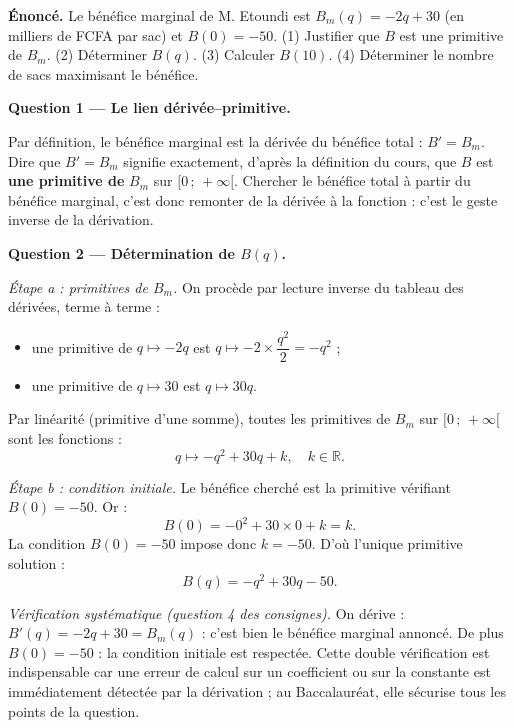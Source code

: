 \documentclass[11pt]{article}
\begin{document}
\begin{exoresolu}
\textbf{Énoncé.} Le bénéfice marginal de M. Etoundi est $B_m(q) = -2q + 30$ (en milliers de FCFA par sac) et $B(0) = -50$. (1) Justifier que $B$ est une primitive de $B_m$. (2) Déterminer $B(q)$. (3) Calculer $B(10)$. (4) Déterminer le nombre de sacs maximisant le bénéfice.

\tcblower

\textbf{Question 1 — Le lien dérivée--primitive.}

Par définition, le bénéfice marginal est la dérivée du bénéfice total : $B' = B_m$. Dire que $B' = B_m$ signifie exactement, d'après la définition du cours, que $B$ est \textbf{une primitive de} $B_m$ sur $[0\,;\,+\infty[$. Chercher le bénéfice total à partir du bénéfice marginal, c'est donc \og remonter \fg{} de la dérivée à la fonction : c'est le geste inverse de la dérivation.

\medskip

\textbf{Question 2 — Détermination de $B(q)$.}

\emph{Étape a : primitives de $B_m$.} On procède par lecture inverse du tableau des dérivées, terme à terme :
\begin{itemize}
\item une primitive de $q \longmapsto -2q$ est $q \longmapsto -2 \times \dfrac{q^2}{2} = -q^2$ ;
\item une primitive de $q \longmapsto 30$ est $q \longmapsto 30q$.
\end{itemize}
Par linéarité (primitive d'une somme), toutes les primitives de $B_m$ sur $[0\,;\,+\infty[$ sont les fonctions :
\[ q \longmapsto -q^2 + 30q + k, \quad k \in \mathbb{R}. \]

\emph{Étape b : condition initiale.} Le bénéfice cherché est la primitive vérifiant $B(0) = -50$. Or :
\[ B(0) = -0^2 + 30 \times 0 + k = k. \]
La condition $B(0) = -50$ impose donc $k = -50$. D'où l'unique primitive solution :
\[ \boxed{B(q) = -q^2 + 30q - 50.} \]

\emph{Vérification systématique (question 4 des consignes).} On dérive : $B'(q) = -2q + 30 = B_m(q)$ : c'est bien le bénéfice marginal annoncé. De plus $B(0) = -50$ : la condition initiale est respectée. Cette double vérification est indispensable car une erreur de calcul sur un coefficient ou sur la constante est immédiatement détectée par la dérivation ; au Baccalauréat, elle sécurise tous les points de la question.

\medskip


\end{exoresolu}
\end{document}
